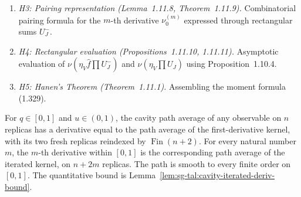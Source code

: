 \begin{remark}
\begin{enumerate}
and vanishing of lower-order derivatives $\nu_0^{(m)}(\eta_V \varepsilon_J \hat f f^-) = 0$ for $2m + r < s$.
\item \emph{H3: Pairing representation (Lemma~1.11.8, Theorem~1.11.9).} Combinatorial pairing formula
for the $m$-th derivative $\nu_0^{(m)}$ expressed through rectangular sums $U_J^-$.
\item \emph{H4: Rectangular evaluation (Propositions~1.11.10, 1.11.11).} Asymptotic evaluation of
$\nu(\eta_V \hat f \prod U_J^-)$ and $\nu(\eta_V \prod U_J)$ using Proposition~1.10.4.
\item \emph{H5: Hanen's Theorem (Theorem~1.11.1).} Assembling the moment formula (1.329).
\end{enumerate}
\end{remark}

\begin{lemma}
\label{lem:sg-tal:hanen-interior-derivatives}
\leanok
For $q \in [0,1]$ and $u \in (0,1)$, the cavity path average of any observable on
$n$ replicas has a derivative equal to the path average of the first-derivative
kernel, with its two fresh replicas reindexed by $\operatorname{Fin}(n+2)$.
For every natural number $m$, the $m$-th derivative within $[0,1]$ is the
corresponding path average of the iterated kernel, on $n+2m$ replicas. The path
is smooth to every finite order on $[0,1]$. The quantitative bound is
Lemma~\ref{lem:sg-tal:cavity-iterated-deriv-bound}.
\end{lemma}
